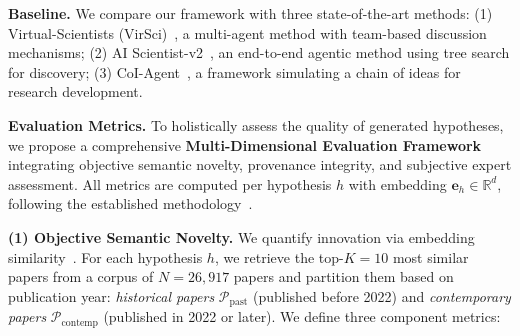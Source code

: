 \documentclass[runningheads]{llncs}
\begin{document}
\textbf{Baseline.} We compare our framework with three state-of-the-art methods: (1) Virtual-Scientists (VirSci)~\cite{DBLP:journals/corr/abs-2410-09403}, a multi-agent method with team-based discussion mechanisms; (2) AI Scientist-v2~\cite{DBLP:journals/corr/abs-2408-06292}, an end-to-end agentic method using tree search for discovery; (3) CoI-Agent~\cite{li2024chain}, a framework simulating a chain of ideas for research development.

\textbf{Evaluation Metrics.} To holistically assess the quality of generated hypotheses, we propose a comprehensive \textbf{Multi-Dimensional Evaluation Framework} integrating objective semantic novelty, provenance integrity, and subjective expert assessment. All metrics are computed per hypothesis $h$ with embedding $\mathbf{e}_h \in \mathbb{R}^d$, following the established methodology~\cite{su2025many}.

\textbf{(1) Objective Semantic Novelty.} We quantify innovation via embedding similarity~\cite{shao2020bertpli,shi2023surprising}. For each hypothesis $h$, we retrieve the top-$K=10$ most similar papers from a corpus of $N=26{,}917$ papers and partition them based on publication year: \textit{historical papers} $\mathcal{P}_{\text{past}}$ (published before 2022) and \textit{contemporary papers} $\mathcal{P}_{\text{contemp}}$ (published in 2022 or later). We define three component metrics:
\end{document}
